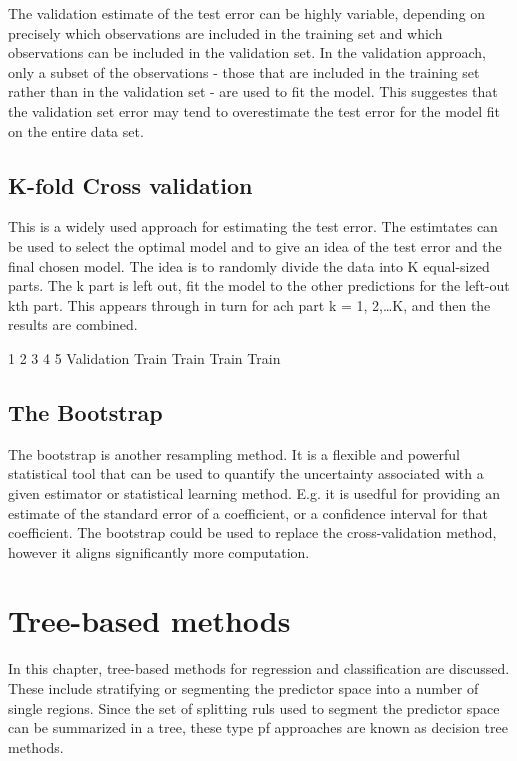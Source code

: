 \documentclass[]{report}
\begin{document}
The validation estimate of the test error can be highly variable,
depending on precisely which observations are included in the training
set and which observations can be included in the validation set. In the
validation approach, only a subset of the observations - those that are
included in the training set rather than in the validation set - are
used to fit the model. This suggestes that the validation set error may
tend to overestimate the test error for the model fit on the entire data
set.

\section{K-fold Cross validation}\label{k-fold-cross-validation}

This is a widely used approach for estimating the test error. The
estimtates can be used to select the optimal model and to give an idea
of the test error and the final chosen model. The idea is to randomly
divide the data into K equal-sized parts. The k part is left out, fit
the model to the other predictions for the left-out kth part. This
appears through in turn for ach part k = 1, 2,\ldots{}K, and then the
results are combined.

1 2 3 4 5 Validation Train Train Train Train

\section{The Bootstrap}\label{the-bootstrap}

The bootstrap is another resampling method. It is a flexible and
powerful statistical tool that can be used to quantify the uncertainty
associated with a given estimator or statistical learning method. E.g.
it is usedful for providing an estimate of the standard error of a
coefficient, or a confidence interval for that coefficient. The
bootstrap could be used to replace the cross-validation method, however
it aligns significantly more computation.

\chapter{Tree-based methods}\label{tree-based-methods}

In this chapter, tree-based methods for regression and classification
are discussed. These include stratifying or segmenting the predictor
space into a number of single regions. Since the set of splitting ruls
used to segment the predictor space can be summarized in a tree, these
type pf approaches are known as decision tree methods.
\end{document}
